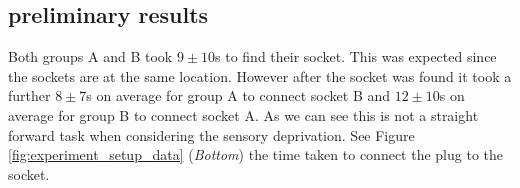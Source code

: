 

\subsection{preliminary results}

Both groups A and B took $9\pm10$s to find their socket. This was expected since the sockets 
are at the same location. However after the socket was found it took a further $8\pm7$s on average for group A to connect
socket B and $12\pm10$s on average for group B to connect socket A. As we can see this is not a straight forward task when considering
the sensory deprivation. See Figure \ref{fig:experiment_setup_data} (\textit{Bottom}) the time taken to connect the plug to the socket.

